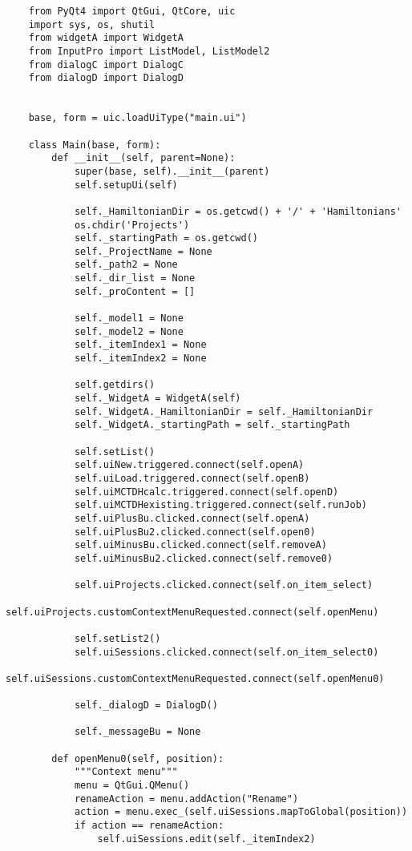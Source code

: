 \begin{verbatim}
    from PyQt4 import QtGui, QtCore, uic
    import sys, os, shutil
    from widgetA import WidgetA
    from InputPro import ListModel, ListModel2
    from dialogC import DialogC
    from dialogD import DialogD
    
    
    base, form = uic.loadUiType("main.ui")
    
    class Main(base, form):
        def __init__(self, parent=None):
            super(base, self).__init__(parent)
            self.setupUi(self)
    
            self._HamiltonianDir = os.getcwd() + '/' + 'Hamiltonians'
            os.chdir('Projects')
            self._startingPath = os.getcwd()
            self._ProjectName = None
            self._path2 = None
            self._dir_list = None
            self._proContent = []
    
            self._model1 = None
            self._model2 = None
            self._itemIndex1 = None
            self._itemIndex2 = None
    
            self.getdirs()
            self._WidgetA = WidgetA(self)
            self._WidgetA._HamiltonianDir = self._HamiltonianDir
            self._WidgetA._startingPath = self._startingPath
    
            self.setList()
            self.uiNew.triggered.connect(self.openA)
            self.uiLoad.triggered.connect(self.openB)
            self.uiMCTDHcalc.triggered.connect(self.openD)
            self.uiMCTDHexisting.triggered.connect(self.runJob)
            self.uiPlusBu.clicked.connect(self.openA)
            self.uiPlusBu2.clicked.connect(self.open0)
            self.uiMinusBu.clicked.connect(self.removeA)
            self.uiMinusBu2.clicked.connect(self.remove0)
    
            self.uiProjects.clicked.connect(self.on_item_select)
            self.uiProjects.customContextMenuRequested.connect(self.openMenu)
    
            self.setList2()
            self.uiSessions.clicked.connect(self.on_item_select0)
            self.uiSessions.customContextMenuRequested.connect(self.openMenu0)
    
            self._dialogD = DialogD()
    
            self._messageBu = None
    
        def openMenu0(self, position):
            """Context menu"""
            menu = QtGui.QMenu()
            renameAction = menu.addAction("Rename")
            action = menu.exec_(self.uiSessions.mapToGlobal(position))
            if action == renameAction:
                self.uiSessions.edit(self._itemIndex2)
    

\end{verbatim}
